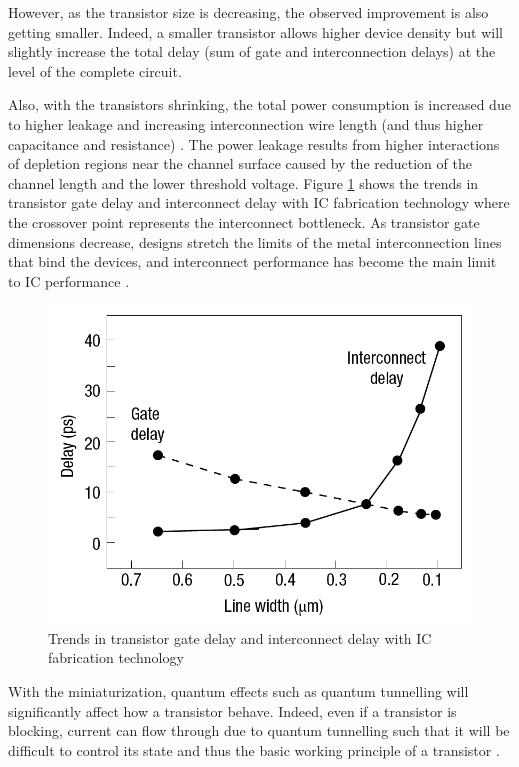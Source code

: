 However, as the transistor size is decreasing, the observed improvement is also getting smaller. Indeed, a smaller transistor allows higher device density but will slightly increase the total delay (sum of gate and interconnection delays) at the level of the complete circuit.

Also, with the transistors shrinking, the total power consumption is increased due to higher leakage and increasing interconnection wire length (and thus higher capacitance and resistance) \cite{5227192}. The power leakage results from higher interactions of depletion regions near the channel surface caused by the reduction of the channel length and the lower threshold voltage. Figure \ref{fig:delaygateinterconnect} shows the trends in transistor gate delay and interconnect delay with IC fabrication technology where the crossover point represents the interconnect bottleneck. As transistor gate dimensions decrease, designs stretch the limits of the metal interconnection lines that bind the devices, and interconnect performance has become the main limit to IC performance \cite{kirchain2007}.

\begin{figure}
\begin{center}
\includegraphics[width=0.7\linewidth]{delaygateinterconnect}
\end{center}
\caption{Trends in transistor gate delay and interconnect delay with IC fabrication technology \cite{kirchain2007}}
\label{fig:delaygateinterconnect}
\end{figure}

With the miniaturization, quantum effects such as quantum tunnelling will significantly affect how a transistor behave. Indeed, even if a transistor is blocking, current can flow through due to quantum tunnelling such that it will be difficult to control its state and thus the basic working principle of a transistor \cite{1240081}.

